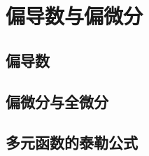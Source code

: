 
\section{偏导数与偏微分}
\label{sec:partial-derivative-and-partial-differential}


\subsection{偏导数}
\label{sec:partial-derivative}

\subsection{偏微分与全微分}
\label{sec:partial-differential}

\subsection{多元函数的泰勒公式}
\label{sec:taylor-formular-of-multivar-fun}



